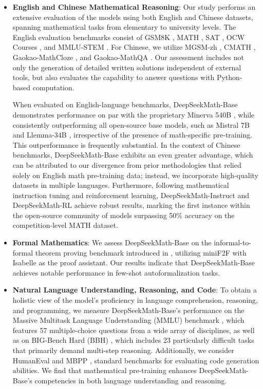 \begin{itemize}[topsep=0pt]
    \item \textbf{English and Chinese Mathematical Reasoning}: Our study performs an extensive evaluation of the models using both English and Chinese datasets, spanning mathematical tasks from elementary to university levels. The English evaluation benchmarks consist of GSM8K \citep{gsm8k}, MATH \citep{MATH}, SAT \citep{llemma}, OCW Courses \citep{minerva}, and MMLU-STEM \citep{mmlu}. For Chinese, we utilize MGSM-zh \citep{mgsm}, CMATH \citep{wei2023cmath}, Gaokao-MathCloze \citep{agieval}, and Gaokao-MathQA \citep{agieval}. Our assessment includes not only the generation of detailed written solutions independent of external tools, but also evaluates the capability to answer questions with Python-based computation.

When evaluated on English-language benchmarks, DeepSeekMath-Base demonstrates performance on par with the proprietary Minerva 540B \citep{minerva}, while consistently outperforming all open-source base models, such as Mistral 7B \citep{mistral} and Llemma-34B \citep{llemma}, irrespective of the presence of math-specific pre-training. This outperformance is frequently substantial. In the context of Chinese benchmarks, DeepSeekMath-Base exhibits an even greater advantage, which can be attributed to our divergence from prior methodologies \citep{minerva,llemma} that relied solely on English math pre-training data; instead, we incorporate high-quality datasets in multiple languages. Furthermore, following mathematical instruction tuning and reinforcement learning, DeepSeekMath-Instruct and DeepSeekMath-RL achieve robust results, marking the first instance within the open-source community of models surpassing 50\% accuracy on the competition-level MATH dataset.

\item \textbf{Formal Mathematics}: We assess DeepSeekMath-Base on the informal-to-formal theorem proving benchmark introduced in \citep{dsp_proof}, utilizing miniF2F \citep{minif2f} with Isabelle \citep{isabelle} as the proof assistant. Our results indicate that DeepSeekMath-Base achieves notable performance in few-shot autoformalization tasks.

\item \textbf{Natural Language Understanding, Reasoning, and Code}: To obtain a holistic view of the model’s proficiency in language comprehension, reasoning, and programming, we measure DeepSeekMath-Base’s performance on the Massive Multitask Language Understanding (MMLU) benchmark \citep{mmlu}, which features 57 multiple-choice questions from a wide array of disciplines, as well as on BIG-Bench Hard (BBH) \citep{bbh}, which includes 23 particularly difficult tasks that primarily demand multi-step reasoning. Additionally, we consider HumanEval \citep{codex} and MBPP \citep{mbpp}, standard benchmarks for evaluating code generation abilities. We find that mathematical pre-training enhances DeepSeekMath-Base’s competencies in both language understanding and reasoning.


\end{itemize}
